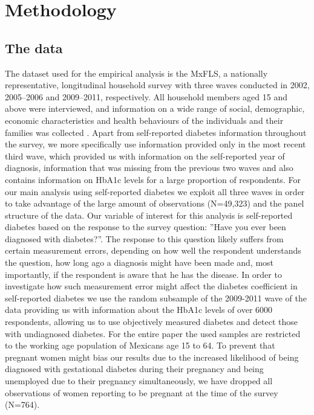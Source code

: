 

\section{\label{sec:Methodology}Methodology}


\subsection{\label{sec:Data}The data}

The dataset used for the empirical analysis is the \acf{MxFLS},
a nationally representative, longitudinal household survey with three
waves conducted in 2002, 2005--2006 and 2009--2011, respectively.
All household members aged 15 and above were interviewed, and information
on a wide range of social, demographic, economic characteristics and
health behaviours of the individuals and their families was collected
\citep{Rubalcava2013}. Apart from self-reported diabetes information
throughout the survey, we more specifically use information provided only in the most recent third wave, which provided us with information
on the self-reported year of diagnosis, information that was missing
from the previous two waves and also contains information on \ac{HbA1c} levels for a large proportion of respondents.  For our main analysis
using self-reported diabetes we exploit all three waves in order to
take advantage of the large amount of observations (N=49,323) and the panel structure
of the data. Our variable of interest for this analysis is self-reported
diabetes based on the response to the survey question: ''Have you
ever been diagnosed with diabetes?''. The response to this question
likely suffers from certain measurement errors, depending on how well
the respondent understands the question, how long ago a diagnosis
might have been made and, most importantly, if the respondent is aware
that he has the disease. In order to investigate how such measurement
error might affect the diabetes coefficient in self-reported diabetes
we use the random subsample of the 2009-2011 wave of the data providing us with information about the \ac{HbA1c} levels of over 6000 respondents, allowing us to use objectively measured diabetes and detect those with undiagnosed diabetes. For the entire paper the used samples are restricted to the working age population of Mexicans age 15 to 64. To prevent that pregnant women might bias our results due to the increased likelihood of being diagnosed with gestational diabetes during their pregnancy and being unemployed due to their pregnancy simultaneously, we have dropped all observations of women reporting to be pregnant at the time of the survey (N=764).

